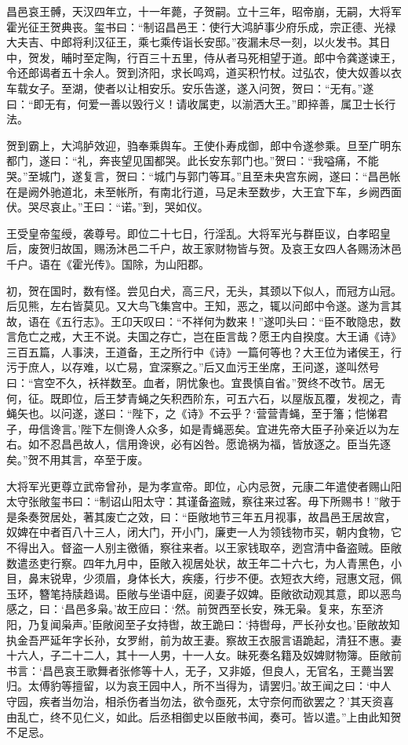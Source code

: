 \documentclass[12pt,UTF8]{ctexbook}
\begin{document}
昌邑哀王髆，天汉四年立，十一年薨，子贺嗣。立十三年，昭帝崩，无嗣，大将军霍光征王贺典丧。玺书曰：“制诏昌邑王：使行大鸿胪事少府乐成，宗正德、光禄大夫吉、中郎将利汉征王，乘七乘传诣长安邸。”夜漏未尽一刻，以火发书。其日中，贺发，晡时至定陶，行百三十五里，侍从者马死相望于道。郎中令龚遂谏王，令还郎谒者五十余人。贺到济阳，求长鸣鸡，道买积竹杖。过弘农，使大奴善以衣车载女子。至湖，使者以让相安乐。安乐告遂，遂入问贺，贺曰：“无有。”遂曰：“即无有，何爱一善以毁行义！请收属吏，以湔洒大王。”即捽善，属卫士长行法。



贺到霸上，大鸿胪效迎，驺奉乘舆车。王使仆寿成御，郎中令遂参乘。旦至广明东都门，遂曰：“礼，奔丧望见国都哭。此长安东郭门也。”贺曰：“我嗌痛，不能哭。”至城门，遂复言，贺曰：“城门与郭门等耳。”且至未央宫东阙，遂曰：“昌邑帐在是阙外驰道北，未至帐所，有南北行道，马足未至数步，大王宜下车，乡阙西面伏。哭尽哀止。”王曰：“诺。”到，哭如仪。



王受皇帝玺绶，袭尊号。即位二十七日，行淫乱。大将军光与群臣议，白孝昭皇后，废贺归故国，赐汤沐邑二千户，故王家财物皆与贺。及哀王女四人各赐汤沐邑千户。语在《霍光传》。国除，为山阳郡。



初，贺在国时，数有怪。尝见白犬，高三尺，无头，其颈以下似人，而冠方山冠。后见熊，左右皆莫见。又大鸟飞集宫中。王知，恶之，辄以问郎中令遂。遂为言其故，语在《五行志》。王卬天叹曰：“不祥何为数来！”遂叩头曰：“臣不敢隐忠，数言危亡之戒，大王不说。夫国之存亡，岂在臣言哉？愿王内自揆度。大王诵《诗》三百五篇，人事浃，王道备，王之所行中《诗》一篇何等也？大王位为诸侯王，行污于庶人，以存难，以亡易，宜深察之。”后又血污王坐席，王问遂，遂叫然号曰：“宫空不久，袄祥数至。血者，阴忧象也。宜畏慎自省。”贺终不改节。居无何，征。既即位，后王梦青蝇之矢积西阶东，可五六石，以屋版瓦覆，发视之，青蝇矢也。以问遂，遂曰：“陛下，之《诗》不云乎？‘营营青蝇，至于籓；恺悌君子，毋信谗言。’陛下左侧谗人众多，如是青蝇恶矣。宜进先帝大臣子孙亲近以为左右。如不忍昌邑故人，信用谗谀，必有凶咎。愿诡祸为福，皆放逐之。臣当先逐矣。”贺不用其言，卒至于废。



大将军光更尊立武帝曾孙，是为孝宣帝。即位，心内忌贺，元康二年遣使者赐山阳太守张敞玺书曰：“制诏山阳太守：其谨备盗贼，察往来过客。毋下所赐书！”敞于是条奏贺居处，著其废亡之效，曰：“臣敞地节三年五月视事，故昌邑王居故宫，奴婢在中者百八十三人，闭大门，开小门，廉吏一人为领钱物市买，朝内食物，它不得出入。督盗一人别主徼循，察往来者。以王家钱取卒，迾宫清中备盗贼。臣敞数遣丞吏行察。四年九月中，臣敞入视居处状，故王年二十六七，为人青黑色，小目，鼻末锐卑，少须眉，身体长大，疾痿，行步不便。衣短衣大绔，冠惠文冠，佩玉环，簪笔持牍趋谒。臣敞与坐语中庭，阅妻子奴婢。臣敞欲动观其意，即以恶鸟感之，曰：‘昌邑多枭。’故王应曰：‘然。前贺西至长安，殊无枭。复来，东至济阳，乃复闻枭声。’臣敞阅至子女持辔，故王跪曰：‘持辔母，严长孙女也。’臣敞故知执金吾严延年字长孙，女罗紨，前为故王妻。察故王衣服言语跪起，清狂不惠。妻十六人，子二十二人，其十一人男，十一人女。昧死奏名籍及奴婢财物簿。臣敞前书言：‘昌邑哀王歌舞者张修等十人，无子，又非姬，但良人，无官名，王薨当罢归。太傅豹等擅留，以为哀王园中人，所不当得为，请罢归。’故王闻之曰：‘中人守园，疾者当勿治，相杀伤者当勿法，欲令亟死，太守奈何而欲罢之？’其天资喜由乱亡，终不见仁义，如此。后丞相御史以臣敞书闻，奏可。皆以遣。”上由此知贺不足忌。
\end{document}
